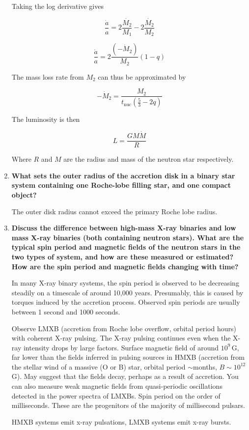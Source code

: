 \documentclass[a4paper]{article}
\begin{document}
\begin{enumerate}
Taking the log derivative gives

$$ \frac{\dot{a}}{a} = 2 \frac{\dot{M_2}}{M_1} - 2 \frac{\dot{M_2}}{M_2} $$

$$ \frac{\dot{a}}{a} = 2 \frac{(-\dot{M}_2)}{M_2} (1-q) $$

The mass loss rate from $M_2$ can thus be approximated by

$$ -\dot{M}_2 = \frac{M_2}{t_\mathrm{nuc}(\frac{5}{3} - 2q)} $$

The luminosity is then

$$ L = \frac{GM\dot{M}}{R} $$

Where $R$ and $M$ are the radius and mass of the neutron star respectively.

\item \textbf{What sets the outer radius of the accretion disk in a binary star system containing one
Roche-lobe filling star, and one compact object?}

The outer disk radius cannot exceed the primary Roche lobe radius. 

\item \textbf{Discuss the difference between high-mass X-ray binaries and low mass X-ray binaries (both containing neutron stars). What are the typical spin period and magnetic fields of the neutron stars in the two types of system, and how are these measured or estimated? How are the spin period and magnetic fields changing with time?}

In many X-ray binary systems, the spin period is observed to be decreasing steadily on a timescale of around 10,000 years. Presumably, this is caused by torques induced by the accretion process. Observed spin periods are usually between 1 second and 1000 seconds. 

Observe LMXB (accretion from Roche lobe overflow, orbital period hours) with coherent X-ray pulsing. The X-ray pulsing continues even when the X-ray intensity drops by large factors. Surface magnetic field of around $10^9$\,G, far lower than the fields inferred in pulsing sources in HMXB (accretion from the stellar wind of a massive (O or B) star, orbital period $\sim$months, $B \sim 10^{12}$\,G). May suggest that the fields decay, perhaps as a result of accretion. You can also measure weak magnetic fields from quasi-periodic oscillations detected in the power spectra of LMXBs. Spin period on the order of milliseconds. These are the progenitors of the majority of millisecond pulsars. 

HMXB systems emit x-ray pulsations, LMXB systems emit x-ray bursts. 


\end{enumerate}
\end{document}
